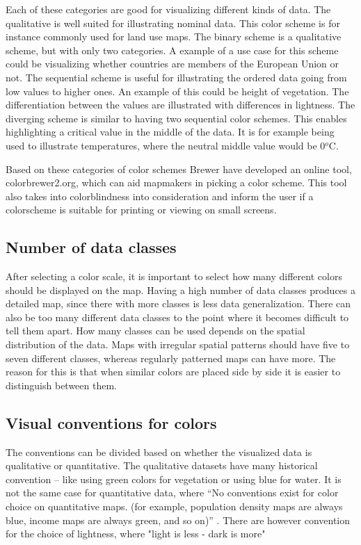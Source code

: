 Each of these categories are good for visualizing different kinds of data. The qualitative is well suited for illustrating nominal data. This color scheme is for instance commonly used for land use maps. The binary scheme is a qualitative scheme, but with only two categories. A example of a use case for this scheme could be visualizing whether countries are members of the European Union or not. 
The sequential scheme is useful for illustrating the ordered data going from low values to higher ones. An example of this could be height of vegetation. The differentiation between the values are illustrated with differences in lightness.
The diverging scheme is similar to having two sequential color schemes. This enables highlighting a critical value in the middle of the data. It is for example being used to illustrate temperatures, where the neutral middle value would be 0$^o$C. \citep{Brewer94}


Based on these categories of color schemes Brewer have developed an online tool, colorbrewer2.org, which can aid mapmakers in picking a color scheme. This tool also takes into colorblindness into consideration and inform the user if a colorscheme is suitable for printing or viewing on small screens. \citep{ColorBrewer}

\subsection{Number of data classes}
After selecting a color scale, it is important to select how many different colors should be displayed on the map. Having a high number of data classes produces a detailed map, since there with more classes is less data generalization. There can also be too many different data classes to the point where it becomes difficult to tell them apart. 
How many classes can be used depends on the spatial distribution of the data. Maps with irregular spatial patterns should have five to seven different classes, whereas regularly patterned maps can have more. The reason for this is that when similar colors are placed side by side it is easier to distinguish between them.\citep{ColorBrewer}

\subsection{Visual conventions for colors}
The conventions can be divided based on whether the visualized data is qualitative or quantitative. The qualitative datasets have many historical convention – like using green colors for vegetation or using blue for water. 
It is not the same case for quantitative data, where “No conventions exist for color choice on quantitative maps. (for example, population density maps are always blue, income maps are always green, and so on)” \citep{Dent}. There are however convention for the choice of lightness, where "light is less - dark is more"

